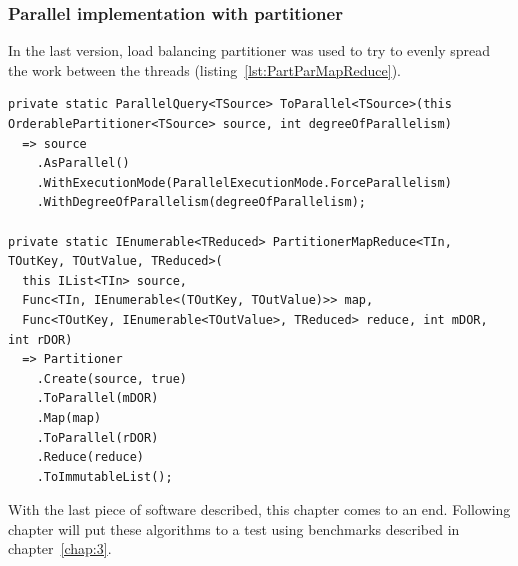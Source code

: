 \subsubsection{Parallel implementation with partitioner}
In the last version, load balancing partitioner was used to try to evenly spread the work between the threads (listing~\ref{lst:PartParMapReduce}).

\begin{lstlisting}[language={[sharp]c}, style=sharpcstyle, caption={Parallel \texttt{MapReduce} implementation with partitioner}, label={lst:PartParMapReduce},
numbers=none, xleftmargin=0pt,framexleftmargin=0pt,framexrightmargin=0pt,framexbottommargin=0pt]
private static ParallelQuery<TSource> ToParallel<TSource>(this OrderablePartitioner<TSource> source, int degreeOfParallelism)
  => source
    .AsParallel()
    .WithExecutionMode(ParallelExecutionMode.ForceParallelism)
    .WithDegreeOfParallelism(degreeOfParallelism);

private static IEnumerable<TReduced> PartitionerMapReduce<TIn, TOutKey, TOutValue, TReduced>(
  this IList<TIn> source,
  Func<TIn, IEnumerable<(TOutKey, TOutValue)>> map,
  Func<TOutKey, IEnumerable<TOutValue>, TReduced> reduce, int mDOR, int rDOR)
  => Partitioner
    .Create(source, true)
    .ToParallel(mDOR)
    .Map(map)
    .ToParallel(rDOR)
    .Reduce(reduce)
    .ToImmutableList();
\end{lstlisting}

With the last piece of software described, this chapter comes to an end. Following chapter will put these algorithms to a test using benchmarks described in chapter~\ref{chap:3}.

